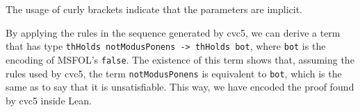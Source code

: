 The usage of curly brackets indicate that the parameters are implicit.

By applying the rules in the sequence generated by cvc5, we can derive a term
that has type \texttt{thHolds notModusPonens -> thHolds bot}, where \texttt{bot}
is the encoding of MSFOL's \texttt{false}.
%
The existence of this term shows that, assuming the rules used by cvc5, the term \texttt{notModusPonens} is equivalent to \texttt{bot}, which is the same as to say that it is unsatisfiable. This way, we have encoded the proof found by cvc5 inside Lean.
